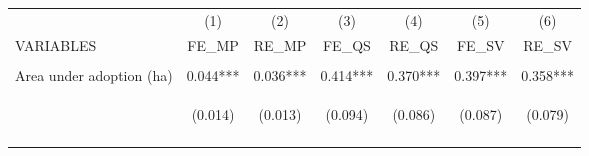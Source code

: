 \begin{center}
\begin{tabular}{lcccccc} \hline
 & (1) & (2) & (3) & (4) & (5) & (6) \\
VARIABLES & FE\_MP & RE\_MP & FE\_QS & RE\_QS & FE\_SV & RE\_SV \\ \hline
\vspace{4pt} & \begin{footnotesize}\end{footnotesize} & \begin{footnotesize}\end{footnotesize} & \begin{footnotesize}\end{footnotesize} & \begin{footnotesize}\end{footnotesize} & \begin{footnotesize}\end{footnotesize} & \begin{footnotesize}\end{footnotesize} \\
Area under adoption (ha) & 0.044*** & 0.036*** & 0.414*** & 0.370*** & 0.397*** & 0.358*** \\
 & \begin{footnotesize}(0.014)\end{footnotesize} & \begin{footnotesize}(0.013)\end{footnotesize} & \begin{footnotesize}(0.094)\end{footnotesize} & \begin{footnotesize}(0.086)\end{footnotesize} & \begin{footnotesize}(0.087)\end{footnotesize} & \begin{footnotesize}(0.079)\end{footnotesize} \\
\vspace{4pt} & \begin{footnotesize}[0.001]\end{footnotesize} & \begin{footnotesize}[0.005]\end{footnotesize} & \begin{footnotesize}[0.000]\end{footnotesize} & \begin{footnotesize}[0.000]\end{footnotesize} & \begin{footnotesize}[0.000]\end{footnotesize} & \begin{footnotesize}[0.000]\end{footnotesize} \\

\end{tabular}
\end{center}

